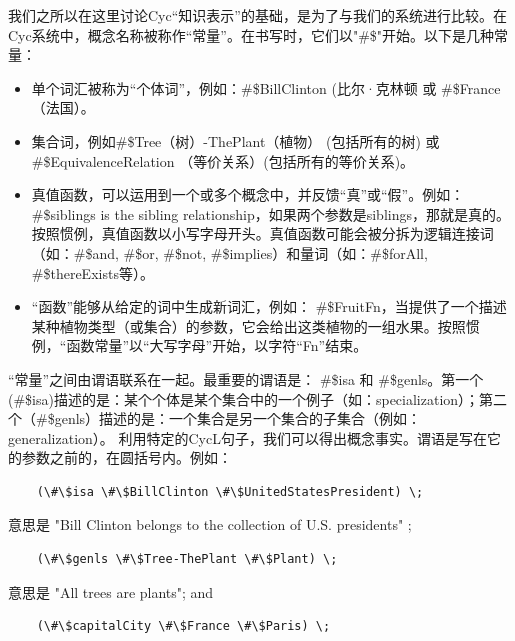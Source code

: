 我们之所以在这里讨论Cyc“知识表示”的基础，是为了与我们的系统进行比较。在Cyc系统中，概念名称被称作“常量”。在书写时，它们以"\#\$"开始。以下是几种常量：

\begin{itemize}
\item 单个词汇被称为“个体词”，例如：\#\$BillClinton (比尔·克林顿 或 \#\$France（法国）。
\item 集合词，例如\#\$Tree（树）-ThePlant（植物） (包括所有的树) 或 \#\$EquivalenceRelation （等价关系）(包括所有的等价关系)。
\item 真值函数，可以运用到一个或多个概念中，并反馈“真”或“假”。例如：\#\$siblings is the sibling relationship，如果两个参数是siblings，那就是真的。按照惯例，真值函数以小写字母开头。真值函数可能会被分拆为逻辑连接词（如：\#\$and, \#\$or, \#\$not, \#\$implies）和量词（如：\#\$forAll, \#\$thereExists等）。
\item “函数”能够从给定的词中生成新词汇，例如：
\#\$FruitFn，当提供了一个描述某种植物类型（或集合）的参数，它会给出这类植物的一组水果。按照惯例，“函数常量”以“大写字母”开始，以字符“Fn”结束。
\end{itemize}

“常量”之间由谓语联系在一起。最重要的谓语是： \#\$isa 和 \#\$genls。第一个(\#\$isa)描述的是：某个个体是某个集合中的一个例子（如：specialization）；第二个（\#\$genls）描述的是：一个集合是另一个集合的子集合（例如：generalization）。
利用特定的CycL句子，我们可以得出概念事实。谓语是写在它的参数之前的，在圆括号内。例如：

 {\tt\begin{small}\begin{lstlisting}
    (\#\$isa \#\$BillClinton \#\$UnitedStatesPresident) \;
    \end{lstlisting}\end{small}}

\noindent 意思是 "Bill Clinton belongs to the collection of U.S. presidents" ;

 {\tt\begin{small}\begin{lstlisting}
    (\#\$genls \#\$Tree-ThePlant \#\$Plant) \;
    \end{lstlisting}\end{small}}
    
\noindent 意思是 "All trees are plants"; and 

 {\tt\begin{small}\begin{lstlisting}
    (\#\$capitalCity \#\$France \#\$Paris) \;
    \end{lstlisting}\end{small}}
    
